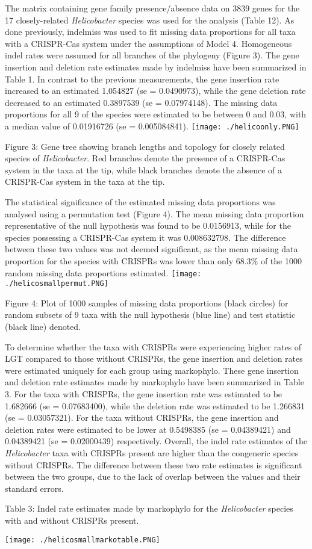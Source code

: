 \documentclass[english]{article}
\begin{document}
The matrix containing gene family presence/absence data on 3839 genes
for the 17 closely-related \textit{Helicobacter} species was used for the
analysis (Table 12).  As done previously, indelmiss was used to fit
missing data proportions for all taxa with a CRISPR-Cas system under
the assumptions of Model 4. Homogeneous indel rates were assumed for
all branches of the phylogeny (Figure 3). The gene insertion and
deletion rate estimates made by indelmiss have been summarized in
Table 1. 
In contrast  to the previous measurements, the gene insertion  rate
increased to an estimated  1.054827 (se = 0.0490973), while the gene
deletion rate decreased to an estimated  0.3897539 (se = 0.07974148).
The missing data  proportions for all 9 of the species were estimated
to be between 0 and 0.03, with a median value of 0.01916726 (se =
0.005084841).
\singlespacing
\texttt{[image: ./helicoonly.PNG]}
\caption{Figure 3: Gene tree showing branch lengths and topology for
closely related species of \textit{Helicobacter}. Red branches denote the presence of
a CRISPR-Cas system in the taxa at the tip, while black branches
denote the absence of a CRISPR-Cas system in the taxa at the tip.}
\singlespacing
The statistical significance of the estimated missing data
proportions was analysed using a permutation test (Figure 4). The mean missing
data proportion representative of the null hypothesis was found to be
0.0156913, while for the species possessing a CRISPR-Cas system it was
0.008632798. The difference between these two values was not deemed
significant, as the mean missing data proportion for the species with
CRISPRs was lower than only 68.3\% of the 1000 random missing data
proportions estimated.  
\singlespacing
\texttt{[image: ./helicosmallpermut.PNG]}
\caption{Figure 4: Plot of 1000 samples of missing data proportions
(black circles) for random subsets of 9 taxa with the null hypothesis
(blue line) and test statistic (black line) denoted.}
\singlespacing
To determine whether the taxa with CRISPRs were experiencing higher
rates of LGT compared to those without CRISPRs, the gene insertion and
deletion rates were estimated uniquely for each group using
markophylo.  These gene insertion and deletion rate estimates made by
markophylo have been summarized in Table 3. For the taxa with CRISPRs, 
the gene insertion rate was
estimated to be 1.682666 (se = 0.07683400), while the deletion rate
was estimated to be 1.266831 (se = 0.03057321). For the taxa without
CRISPRs, the gene insertion and deletion rates were estimated to be
lower at 0.5498385 (se = 0.04389421) and 0.04389421 (se = 0.02000439)
respectively. Overall, the indel rate estimates of the
\textit{Helicobacter}
taxa with CRISPRs present are higher than the congeneric species
without CRISPRs.  The difference between these two rate estimates is
significant between the two groups, due to the lack of
overlap between the values and their standard errors. 
\singlespacing
\caption{Table 3: Indel rate estimates made by markophylo for the
\textit{Helicobacter} species with and without CRISPRs present.}
\newline
\texttt{[image: ./helicosmallmarkotable.PNG]}
\singlespacing
\end{document}
